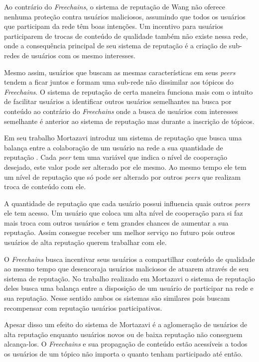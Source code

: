 \documentclass[12pt]{article}
\newcommand{\FC} {\emph{Freechains}\xspace}
\begin{document}
Ao contrário do \FC, o sistema de reputação de Wang não oferece nenhuma proteção contra usuários maliciosos, assumindo que todos os usuários que participam da rede têm boas intenções. Um incentivo para usuários participarem de trocas de conteúdo de qualidade também não existe nessa rede, onde a consequência principal de seu sistema de reputação é a criação de sub-redes de usuários com os mesmo interesses.

Mesmo assim, usuários que buscam as mesmas características em seus \emph{peers} tendem a ficar juntos e formam uma sub-rede não dissimilar aos tópicos do \FC. O sistema de reputação de certa maneira funciona mais com o intuito de facilitar usuários a identificar outros usuários semelhantes na busca por conteúdo ao contrário do \FC onde a busca de usuários com interesses semelhante é anterior ao sistema de reputação mas durante a inscrição de tópicos.

Em seu trabalho Mortazavi introduz um sistema de reputação que busca uma balança entre a colaboração de um usuário na rede a sua quantidade de reputação \cite{mortazavi2006cumulative}. Cada \emph{peer} tem uma variável que indica o nível de cooperação desejado, este valor pode ser alterado por ele mesmo. Ao mesmo tempo ele tem um nível de reputação que só pode ser alterado por outros \emph{peers} que realizam troca de conteúdo com ele.

A quantidade de reputação que cada usuário possui influencia quais outros \emph{peers} ele tem acesso. Um usuário que coloca um alta nível de cooperação para si faz mais troca com outros usuários e tem grandes chances de aumentar a sua reputação. Assim consegue receber um melhor serviço no futuro pois outros usuários de alta reputação querem trabalhar com ele.

O \FC busca incentivar seus usuários a compartilhar conteúdo de qualidade ao mesmo tempo que desencoraja usuários maliciosos de atuarem através de seu sistema de reputação. No trabalho realizado em Mortazavi o sistema de reputação deles busca uma balança entre a disposição de um usuário de participar na rede e sua reputação. Nesse sentido ambos os sistemas são similares pois buscam recompensar com reputação usuários participativos.

Apesar disso um efeito do sistema de Mortazavi é a aglomeração de usuários de alta reputação enquanto usuários novos ou de baixa reputação não conseguem alcança-los. O \FC e sua propagação de conteúdo estão acessíveis a todos os usuários de um tópico não importa o quanto tenham participado até então.
\end{document}
